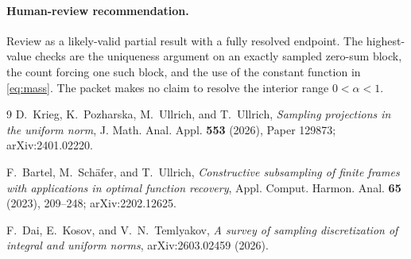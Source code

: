 \documentclass[11pt]{article}
\begin{document}
\paragraph{Human-review recommendation.}
Review as a likely-valid partial result with a fully resolved endpoint.  The
highest-value checks are the uniqueness argument on an exactly sampled
zero-sum block, the count forcing one such block, and the use of the constant
function in \eqref{eq:mass}.  The packet makes no claim to resolve the
interior range $0<\alpha<1$.

\begin{thebibliography}{9}
D.~Krieg, K.~Pozharska, M.~Ullrich, and T.~Ullrich,
\emph{Sampling projections in the uniform norm},
J. Math. Anal. Appl. \textbf{553} (2026), Paper 129873;
arXiv:2401.02220.

F.~Bartel, M.~Sch\"afer, and T.~Ullrich,
\emph{Constructive subsampling of finite frames with applications in
optimal function recovery},
Appl. Comput. Harmon. Anal. \textbf{65} (2023), 209--248;
arXiv:2202.12625.

F.~Dai, E.~Kosov, and V.~N.~Temlyakov,
\emph{A survey of sampling discretization of integral and uniform norms},
arXiv:2603.02459 (2026).
\end{thebibliography}
\end{document}

